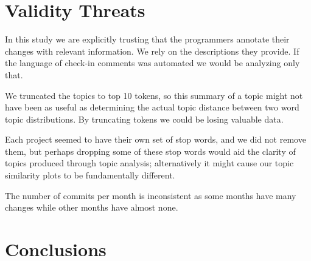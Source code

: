 \documentclass[times, 10pt,twocolumn]{article}
\newcommand{\shrinkit}{\vspace*{-.3em}}
\begin{document}


\shrinkit
\section{Validity Threats}
\shrinkit

In this study we are explicitly trusting that the programmers annotate
their changes with relevant information. We rely on the descriptions
they provide. If the language of check-in comments was automated we
would  be analyzing only that.

We truncated the topics to top 10 tokens, so this summary of a topic
might not have been as useful as determining the actual topic distance
between two word topic distributions. By truncating tokens we could be
losing valuable data.

Each project seemed to have their own set of stop words, and we did not
remove them, but perhaps dropping some of these stop words would aid
the clarity of topics produced through topic analysis; alternatively
it might cause our topic similarity plots to be fundamentally
different.

The number of commits per month is inconsistent as some months have
many changes while other months have almost none.




\shrinkit
\section{Conclusions}
\shrinkit





\end{document}
